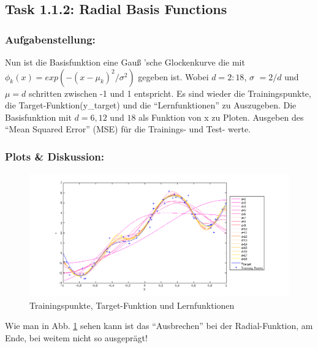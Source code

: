 \subsection{Task 1.1.2: Radial Basis Functions}


\subsubsection{Aufgabenstellung:}
Nun ist die Basisfunktion eine Gau\ss{} 'sche Glockenkurve die mit $\phi_k(x) = exp(-(x-\mu_k)^2 /\sigma^2 )$ gegeben ist.
Wobei $d=2:18$, $\sigma$ $= 2/d$ und $\mu =d$ schritten zwischen -1 und 1 entspricht.
Es sind wieder  die Trainingspunkte, die Target-Funktion(y\_target) und die ``Lernfunktionen'' zu Auszugeben.
Die Basisfunktion mit $d=6,12$ und $18$ als Funktion von x zu Ploten.
Ausgeben des ``Mean Squared Error'' (MSE) für die Trainings- und Test- werte.



\subsubsection{Plots \& Diskussion:}


\begin{figure}[hp!]
\begin{center}
 \includegraphics[width=1\textwidth]{./figures/RBF_learn}
 \caption[Trainingspunkte, Target-Funktion und Lernfunktionen]{Trainingspunkte, Target-Funktion und Lernfunktionen}
\label{fig:RBF_learn}
\end{center}
\end{figure}
Wie man in Abb. \ref{fig:RBF_learn} sehen kann ist das ``Ausbrechen'' bei der Radial-Funktion, am Ende, bei weitem nicht so ausgeprägt!

